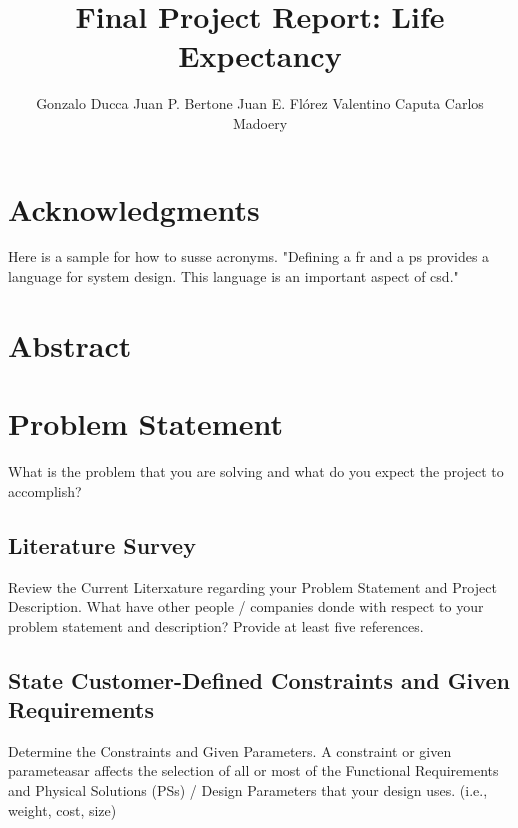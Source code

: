 \documentclass{other/docTemplate}
\author{Gonzalo Ducca\formatemail{Email 1} Juan P. Bertone\formatemail{Email 2} Juan E. Flórez\formatemail{juan.florez@upr.edu} Valentino Caputa\formatemail{Email 4} Carlos Madoery\formatemail{Email 5}}
\title{Final Project Report: Life Expectancy}
\begin{document}
 
\maketitle

\startTable
{}
\AddRevision{}{}{}
\stopTable

\tableofcontents
\listoftables
\listoffigures
\printglossary[title=List of Acronyms ,type=\acronymtype]
\clearpage

\section*{Acknowledgments}

Here is a sample for how to susse acronyms. "Defining a \gls{fr} and a \gls{ps} provides a language for system design. This language is an important aspect of \gls{csd}."
\newpage

\section*{Abstract}
\newpage

\section{Problem Statement}
What is the problem that you are solving and what do you expect the project to accomplish?

\subsection{Literature Survey}
Review the Current Literxature regarding your Problem Statement and Project Description. 
What have other people / companies donde with respect to your problem statement and description? Provide at least five references.


\subsection{State Customer-Defined Constraints and Given Requirements}
Determine the Constraints and Given Parameters.
A constraint or given parameteasar affects the selection of all or most of the Functional Requirements and Physical Solutions (PSs) / Design Parameters that your design uses. (i.e., weight, cost, size)
\end{document}
